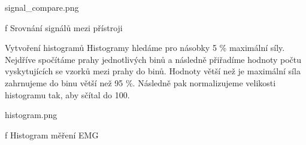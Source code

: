         \midinsert
            \picheight=7cm \cinspic signal_compare.png
            \caption/f Srovnání signálů mezi přístroji
        \endinsert

     Vytvoření histogramů
        Histogramy hledáme pro násobky 5 \% maximální síly. Nejdříve spočítáme prahy jednotlivých binů a následně přiřadíme hodnoty počtu vyskytujících se vzorků mezi prahy do binů. Hodnoty větší než je maximální síla zahrnujeme do binu větší než 95 \%. Následně pak normalizujeme velikosti histogramu tak, aby sčítal do 100.

        \midinsert
            \picheight=7cm \cinspic histogram.png
            \caption/f Histogram měření EMG
        \endinsert
